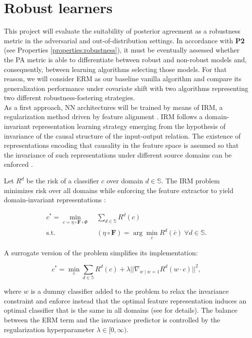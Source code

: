 \section{Robust learners}\label{sec:robust_learners}

This project will evaluate the suitability of posterior agreement as a robustness
metric in the adversarial and out-of-distribution settings. In accordance with
\textbf{P2} (see Properties \ref{properties:robustness}), it must be eventually
assessed whether the PA metric is able to differentiate between robust and non-robust
models and, consequently, between learning algorithms selecting those models.
For that reason, we will consider ERM as our baseline vanilla algorithm and compare its 
generalization performance under covariate shift with two algorithms representing two 
different robustness-fostering strategies. \\

As a first approach, NN architectures will be trained by means of IRM, a regularization method driven 
by feature alignment \cite{arjovskyInvariantRiskMinimization2020}.
IRM follows a domain-invariant representation 
learning strategy emerging from the hypothesis of invariance of the 
causal structure of the input-output relation. The existence of 
representations encoding that causality in the feature space is assumed so 
that the invariance of such representations
under different source domains can be enforced
\cite{liuOutOfDistributionGeneralizationSurvey2023}.

\begin{definition}
    Let $R^d$ be the risk of a classifier $c$
    over domain $d \in \mathbb{S}$. The IRM problem minimizes risk over all domains
    while enforcing the feature extractor to yield domain-invariant representations
    \cite{arjovskyInvariantRiskMinimization2020}:

    $$
        \begin{aligned}
            c^* = \min_{c = \eta \circ \bm{F} \circ \Phi} & \; \sum_{d \in \mathbb{S}} R^d(c) \\
            \text{s.t.} & \; (\eta \circ \bm{F}) = \arg \min_{\bar{c}} R^d(\bar{c}) \; \forall d \in \mathbb{S}.
        \end{aligned}
    $$

    A surrogate version of the problem simplifies its implementation:

    $$
        c^* = \min_{c} \sum_{d \in \mathbb{S}} R^d(c) + \lambda || \nabla_{w \mid w = 1} R^d(w \cdot c) ||^2,
    $$

    where $w$ is a dummy classifier added to the problem to relax the invariance
    constraint and enforce instead that the optimal feature representation induces
    an optimal classifier that is the same in all domains (see
    \cite{arjovskyInvariantRiskMinimization2020} for details). The balance between
    the ERM term and the invariance predictor is controlled by
    the regularization hyperparameter $\lambda \in [0, \infty)$.
\end{definition}

